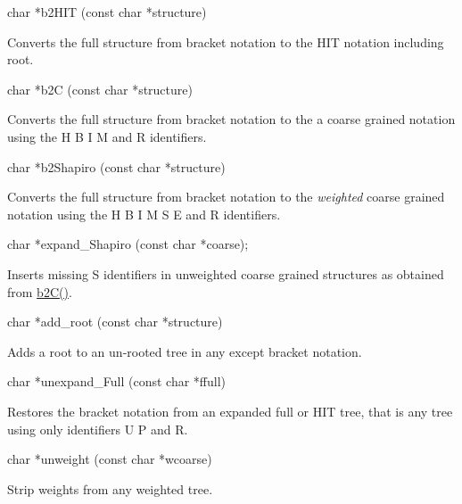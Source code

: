 \begin{DoxyVerb}char *b2HIT (const char *structure)
\end{DoxyVerb}
 Converts the full structure from bracket notation to the H\+I\+T notation including root.

\begin{DoxyVerb}char *b2C (const char *structure)
\end{DoxyVerb}
 Converts the full structure from bracket notation to the a coarse grained notation using the \textquotesingle{}H\textquotesingle{} \textquotesingle{}B\textquotesingle{} \textquotesingle{}I\textquotesingle{} \textquotesingle{}M\textquotesingle{} and \textquotesingle{}R\textquotesingle{} identifiers.

\begin{DoxyVerb}char *b2Shapiro (const char *structure)
\end{DoxyVerb}
 Converts the full structure from bracket notation to the {\itshape weighted} coarse grained notation using the \textquotesingle{}H\textquotesingle{} \textquotesingle{}B\textquotesingle{} \textquotesingle{}I\textquotesingle{} \textquotesingle{}M\textquotesingle{} \textquotesingle{}S\textquotesingle{} \textquotesingle{}E\textquotesingle{} and \textquotesingle{}R\textquotesingle{} identifiers.

\begin{DoxyVerb}char  *expand_Shapiro (const char *coarse);
\end{DoxyVerb}
 Inserts missing \textquotesingle{}S\textquotesingle{} identifiers in unweighted coarse grained structures as obtained from \hyperlink{group__struct__utils_ga9c80d92391f2833549a8b6dac92233f0}{b2\+C()}.

\begin{DoxyVerb}char *add_root (const char *structure)
\end{DoxyVerb}
 Adds a root to an un-\/rooted tree in any except bracket notation.

\begin{DoxyVerb}char  *unexpand_Full (const char *ffull)
\end{DoxyVerb}
 Restores the bracket notation from an expanded full or H\+I\+T tree, that is any tree using only identifiers \textquotesingle{}U\textquotesingle{} \textquotesingle{}P\textquotesingle{} and \textquotesingle{}R\textquotesingle{}.

\begin{DoxyVerb}char  *unweight (const char *wcoarse)
\end{DoxyVerb}
 Strip weights from any weighted tree.

